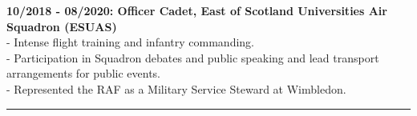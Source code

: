 \textbf{10/2018 - 08/2020: Officer Cadet, East of Scotland Universities Air Squadron (ESUAS)}\\
 - Intense flight training and infantry commanding.\\
 - Participation in Squadron debates and public speaking and lead transport arrangements for public events.\\
 - Represented the RAF as a Military Service Steward at Wimbledon.\\
\noindent\rule[0.5ex]{\linewidth}{1pt}


